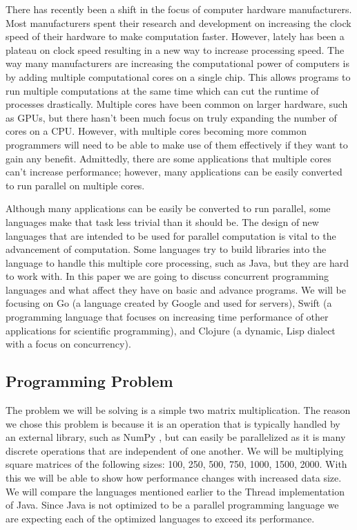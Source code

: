 There has recently been a shift in the focus of computer hardware manufacturers. Most manufacturers spent their research and development on increasing the clock speed of their hardware to make computation faster. However, lately has been a plateau on clock speed resulting in a new way to increase processing speed. The way many manufacturers are increasing the computational power of computers is by adding multiple computational cores on a  single chip. This allows programs to run multiple computations at the same time which can cut the runtime of processes drastically. Multiple cores have been common on larger hardware, such as GPUs, but there hasn't been much focus on truly expanding the number of cores on a CPU. However, with multiple cores becoming more common programmers will need to be able to make use of them effectively if they want to gain any benefit. Admittedly, there are some applications that multiple cores can't increase performance; however, many applications can be easily converted to run parallel on multiple cores.

Although many applications can be easily be converted to run parallel, some languages make that task less trivial than it should be. The design of new languages that are intended to be used for parallel computation is vital to the advancement of computation. Some languages try to build libraries into the language to handle this multiple core processing, such as Java, but they are hard to work with. In this paper we are going to discuss concurrent programming languages and what affect they have on basic and advance programs. We will be focusing on Go (a language created by Google and used for servers), Swift (a programming language that focuses on increasing time performance of other applications for scientific programming), and Clojure (a dynamic, Lisp dialect with a focus on concurrency).

\subsection{Programming Problem}
    The problem we will be solving is a simple two matrix multiplication. The reason we chose this problem is because it is an operation that is typically handled by an external library, such as NumPy \cite{numpy}, but can easily be parallelized as it is many discrete operations that are independent of one another. We will be multiplying square matrices of the following sizes: 100, 250, 500, 750, 1000, 1500, 2000. With this we will be able to show how performance changes with increased data size. We will compare the languages mentioned earlier to the Thread implementation of Java. Since Java is not optimized to be a parallel programming language we are expecting each of the optimized languages to exceed its performance.

